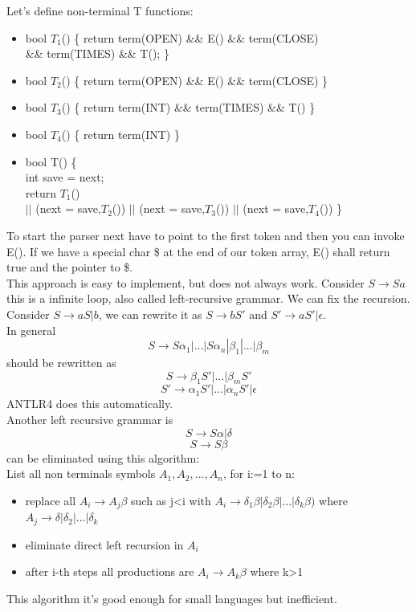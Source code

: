 \documentclass[12pt]{article}
\begin{document}
Let's define non-terminal T functions: 
\begin{itemize}
    \item bool $T_1$() \{ return term(OPEN) \&\& E() \&\& term(CLOSE) \\ \&\& term(TIMES) \&\& T(); \}
    \item bool $T_2$() \{ return term(OPEN) \&\& E() \&\& term(CLOSE) \}
    \item bool $T_3$() \{ return term(INT) \&\& term(TIMES) \&\& T() \}
    \item bool $T_4$() \{ return term(INT) \}
    \item bool T() \{
            \\ int save = next;
            \\ return $T_1$() 
            \\ $||$ (next = save,$T_2$()) $||$ (next = save,$T_3$()) $||$ (next = save,$T_4$())
        \}
\end{itemize}
To start the parser next have to point to the first token and then you can invoke E(). If we have a special char \$ at the end of our token array, E() shall return true and the pointer to \$.
\\ This approach is easy to implement, but does not always work. Consider $S \rightarrow Sa$ this is a infinite loop, also called left-recursive grammar. We can fix the recursion. 
\\ Consider $S \rightarrow aS | b$, we can rewrite it as $S \rightarrow bS'$ and $S' \rightarrow aS' | \epsilon$.
\\ In general 
\[ S \rightarrow S\alpha_1 | ... | S\alpha_n | \beta_1 |...| \beta_m \]
should be rewritten as 
\[ S \rightarrow \beta_1S' | ... | \beta_mS' \]
\[ S' \rightarrow \alpha_1S' | ... | \alpha_nS' | \epsilon \]
ANTLR4 does this automatically.
\vspace{2mm}
\\ Another left recursive grammar is 
\[ S \rightarrow S\alpha | \delta \]
\[ S \rightarrow S\beta \]
can be eliminated using this algorithm: 
\\ List all non terminals symbols $A_1, A_2, ..., A_n$, for i:=1 to n: 
\begin{itemize}
    \item replace all $A_i \rightarrow A_j\beta$ such as j<i with $A_i \rightarrow \delta_1 \beta | \delta_2 \beta | ... | \delta_k \beta)$ where $A_j \rightarrow \delta | \delta_2 | ... | \delta_k$
    \item eliminate direct left recursion in $A_i$
    \item after i-th steps all productions are $A_i \rightarrow A_k\beta$ where k>1
\end{itemize}
This algorithm it's good enough for small languages but inefficient. 
\end{document}

